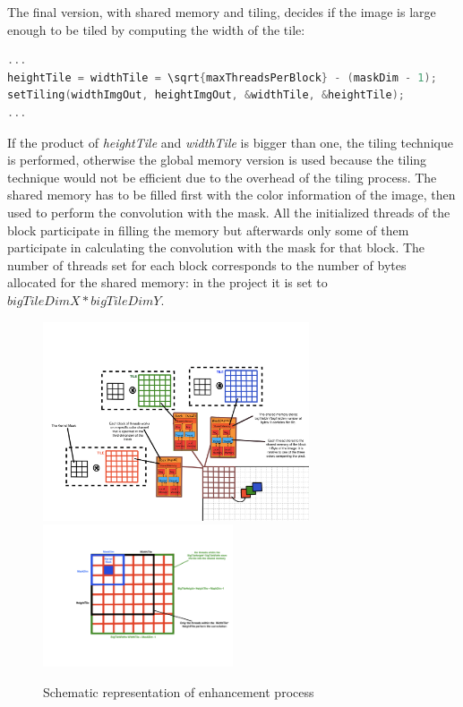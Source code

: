     The final version, with shared memory and tiling, decides if the image is large enough to be tiled by computing the width of the tile:
    \noindent\begin{lstlisting}[language=C]
...
heightTile = widthTile = \sqrt{maxThreadsPerBlock} - (maskDim - 1);
setTiling(widthImgOut, heightImgOut, &widthTile, &heightTile);
...
    \end{lstlisting}
    
    \noindent If the product of \textit{heightTile} and \textit{widthTile} is bigger than one, the tiling technique is performed, otherwise the global memory version is used because the tiling technique would not be efficient
    due to the overhead of the tiling process.
    The shared memory has to be filled first with the color information of the image, then used to perform the convolution with the mask.
    All the initialized threads of the block participate in filling the memory but afterwards only some of them participate in calculating the convolution with the mask for that block.
    The number of threads set for each block corresponds to the number of bytes allocated for the shared memory: in the project it is set to $bigTileDimX*bigTileDimY$.

    \begin{figure}
        \centering
        \includegraphics[width=0.7\textwidth]{img/scheme.png}
        \includegraphics[width=0.5\textwidth]{img/threadsscheme.png}
        \caption{Schematic representation of enhancement process}
        \label{fig:tiling}
    \end{figure}

